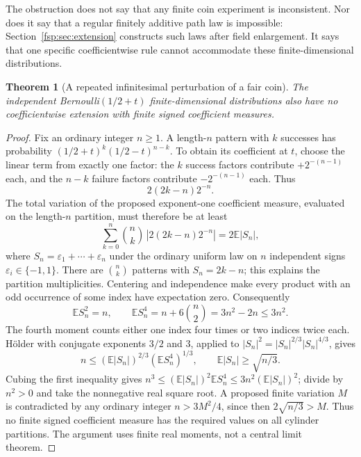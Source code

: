 \documentclass[11pt,a4paper]{article}
\numberwithin{equation}{section}
\newtheorem{theorem}{Theorem}[section]
\theoremstyle{definition}
\theoremstyle{remark}
\newcommand{\E}{\mathbb E}
\begin{document}
The obstruction does not say that any finite coin experiment is
inconsistent. Nor does it say that a regular finitely additive path law
is impossible: Section~\ref{fsp:sec:extension} constructs such laws after
field enlargement. It says that one specific coefficientwise rule cannot
accommodate these finite-dimensional distributions.

\begin{theorem}[A repeated infinitesimal perturbation of a fair coin]
\label{fsp:thm:faircoin}
The independent Bernoulli$(1/2+t)$ finite-dimensional distributions also
have no coefficientwise extension with finite signed coefficient measures.
\end{theorem}
\begin{proof}
Fix an ordinary integer $n\ge1$. A length-$n$ pattern with $k$
successes has probability $(1/2+t)^k(1/2-t)^{n-k}$.
To obtain its coefficient at $t$, choose the linear term from exactly
one factor: the $k$ success factors contribute $+2^{-(n-1)}$ each,
and the $n-k$ failure factors contribute $-2^{-(n-1)}$ each. Thus
\begin{equation}\label{fsp:eq:coinrow}
 2(2k-n)2^{-n}.
\end{equation}
The total variation of the proposed exponent-one coefficient measure,
evaluated on the length-$n$ partition, must therefore be at least
\[
 \sum_{k=0}^n\binom nk\,|2(2k-n)2^{-n}|=2\E|S_n|,
\]
where $S_n=\varepsilon_1+\cdots+\varepsilon_n$ under the ordinary
uniform law on $n$ independent signs $\varepsilon_i\in\{-1,1\}$.
There are $\binom nk$ patterns with $S_n=2k-n$; this explains the
partition multiplicities. Centering and independence make every product
with an odd occurrence of some index have expectation zero. Consequently
\[
 \E S_n^2=n,\qquad
 \E S_n^4=n+6\binom n2=3n^2-2n\le3n^2.
\]
The fourth moment counts either one index four times or two indices
twice each. H\"older with conjugate exponents $3/2$ and $3$, applied to
$|S_n|^2=|S_n|^{2/3}|S_n|^{4/3}$, gives
\begin{equation}
 n\le(\E|S_n|)^{2/3}(\E S_n^4)^{1/3},
 \qquad \E|S_n|\ge\sqrt{n/3}.
\end{equation}
Cubing the first inequality gives
$n^3\le(\E|S_n|)^2\E S_n^4\le3n^2(\E|S_n|)^2$;
divide by $n^2>0$ and take the nonnegative real square root.
A proposed finite variation $M$ is contradicted by any ordinary integer
$n>3M^2/4$, since then $2\sqrt{n/3}>M$. Thus no finite signed
coefficient measure has the required values on all cylinder partitions.
The argument uses finite real moments, not a central limit theorem.
\end{proof}
\end{document}

